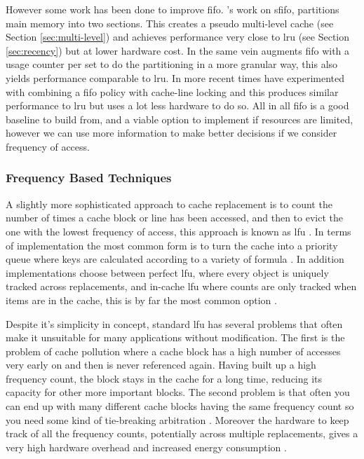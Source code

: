 However some work has been done to improve \gls{fifo}. \citet{turnerSegmentedFIFOPage1981}'s work on \gls{sfifo}, partitions main memory into two sections. This creates a pseudo multi-level cache (see Section \ref{sec:multi-level}) and achieves performance very close to \gls{lru} (see Section \ref{sec:recency}) but at lower hardware cost. In the same vein \citet{devilleLowcostUsagebasedReplacement1990} augments \gls{fifo} with a usage counter per set to do the partitioning in a more granular way, this also yields performance comparable to \gls{lru}. In more recent times \citet{wei-chetsengPRRLowoverheadCache2012} have experimented with combining a \gls{fifo} policy with cache-line locking and this produces similar performance to \gls{lru} but uses a lot less hardware to do so. All in all \gls{fifo} is a good baseline to build from, and a viable option to implement if resources are limited, however we can use more information to make better decisions if we consider frequency of access. 

\subsubsection{Frequency Based Techniques}

A slightly more sophisticated approach to cache replacement is to count the number of times a cache block or line has been accessed, and then to evict the one with the lowest frequency of access, this approach is known as \gls{lfu} . In terms of implementation the most common form is to turn the cache into a priority queue where keys are calculated according to a variety of formula \cite{podlipnigSurveyWebCache2003}. In addition implementations choose between perfect \gls{lfu}, where every object is uniquely tracked across replacements, and in-cache \gls{lfu} where counts are only tracked when items are in the cache, this is by far the most common option \cite{podlipnigSurveyWebCache2003}.

Despite it's simplicity in concept, standard \gls{lfu} has several problems that often make it unsuitable for many applications without modification. The first is the problem of cache pollution \cite{karedlaCachingStrategiesImprove1994} where a cache block has a high number of accesses very early on and then is never referenced again. Having built up a high frequency count, the block stays in the cache for a long time, reducing its capacity for other more important blocks. The second problem is that often you can end up with many different cache blocks having the same frequency count so you need some kind of tie-breaking arbitration \cite{podlipnigSurveyWebCache2003}.  Moreover the hardware to keep track of all the frequency counts, potentially across multiple replacements, gives a very high hardware overhead and increased energy consumption \cite{pandaSurveyReplacementStrategies2016}. 

